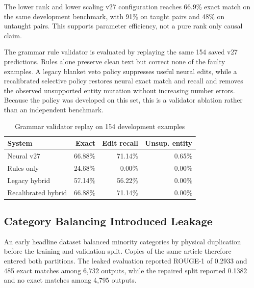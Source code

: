\documentclass[a4paper,conference]{IEEEtran}
\begin{document}
The lower rank and lower scaling v27 configuration reaches 66.9\% exact match on
the same development benchmark, with 91\% on taught pairs and 48\% on untaught
pairs. This supports parameter efficiency, not a pure rank only causal claim.

The grammar rule validator is evaluated by replaying the same 154 saved v27
predictions. Rules alone preserve clean text but correct none of the faulty
examples. A legacy blanket veto policy suppresses useful neural edits, while a
recalibrated selective policy restores neural exact match and recall and
removes the observed unsupported entity mutation without increasing number
errors. Because the policy was developed on this set, this is a validator
ablation rather than an independent benchmark.

\begin{table}[!b]
\caption{Grammar validator replay on 154 development examples}
\label{tab:hybrid}
\centering
\footnotesize
\setlength{\tabcolsep}{2.3pt}
\renewcommand{\arraystretch}{1.03}
\begin{tabular}{|l|r|r|r|}
\hline
\textbf{System} & \textbf{Exact} & \textbf{Edit recall} & \textbf{Unsup. entity} \\
\hline
Neural v27 & 66.88\% & 71.14\% & 0.65\% \\
\hline
Rules only & 24.68\% & 0.00\% & 0.00\% \\
\hline
Legacy hybrid & 57.14\% & 56.22\% & 0.00\% \\
\hline
Recalibrated hybrid & 66.88\% & 71.14\% & 0.00\% \\
\hline
\end{tabular}
\end{table}

\subsection{Category Balancing Introduced Leakage}
\label{sec:leak}
An early headline dataset balanced minority categories by physical duplication
before the training and validation split. Copies of the same article therefore entered
both partitions. The leaked evaluation reported ROUGE-1 of 0.2933 and 485 exact
matches among 6,732 outputs, while the repaired split reported 0.1382 and no
exact matches among 4,795 outputs.
\end{document}
